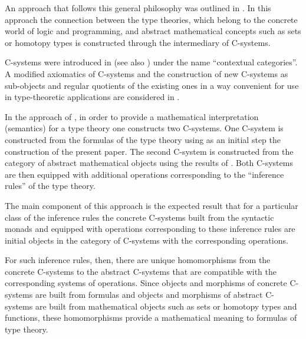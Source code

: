 \documentclass[11pt]{article}
\begin{document}


An approach that follows this general philosophy was outlined in \cite{CMUtalk}. In this approach the connection between the type theories, which belong to the concrete world of logic and programming, and abstract mathematical concepts such as sets or homotopy types is constructed through the intermediary of C-systems. 

C-systems were introduced in \cite{Cartmell0} (see also \cite{Cartmell1}) under the name ``contextual categories''. A modified axiomatics of C-systems and the construction of new C-systems as sub-objects and regular quotients of the existing ones in a way convenient for use in type-theoretic applications are considered in \cite{Csubsystems}.

In the approach of \cite{CMUtalk}, in order to provide a mathematical interpretation (semantics) for a type theory one constructs two C-systems. One C-system is constructed from the formulas of the type theory using as an initial step the construction of the present paper. The second C-system is constructed from the category of abstract mathematical objects using the results of \cite{Cfromauniverse}. Both C-systems are then equipped with additional operations corresponding to the ``inference rules'' of the type theory. 

The main component of this approach is the expected result that for a particular class of the inference rules the concrete C-systems built from the syntactic monads and equipped with operations corresponding to these inference rules are initial objects in the category of C-systems with the corresponding operations. 

For such inference rules, then, there are unique homomorphisms from the concrete C-systems to the abstract C-systems that are compatible with the corresponding systems of operations. Since objects and morphisms of concrete C-systems are built from formulas and objects and morphisms of abstract C-systems are built from mathematical objects such as sets or homotopy types and functions, these homomorphisms provide a mathematical meaning to formulas of type theory. 
\end{document}
